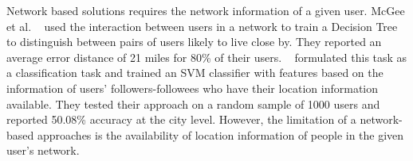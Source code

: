 Network based solutions requires the network information of a given user. McGee et al. ~\cite{mcgee2013location} used the interaction between users in a network to train a Decision Tree to distinguish between pairs of users likely to live close by. They reported an average error distance of 21 miles for 80\% of their users. ~\cite{rout2013s} formulated this task as a classification task and trained an SVM classifier with features based on the information of users' followers-followees who have their location information available. They tested their approach on a random sample of 1000 users and reported 50.08\% accuracy at the city level. However, the limitation of a network-based approaches is the availability of location information of people in the given user's network.   

